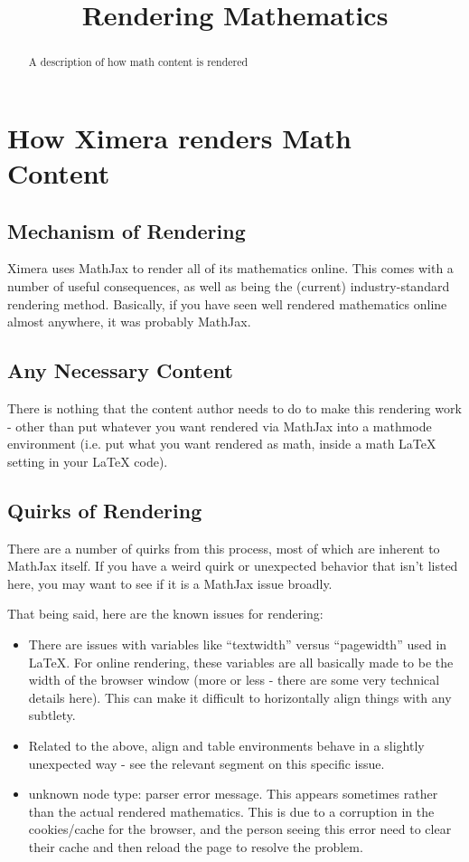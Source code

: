 \documentclass{ximera}
\title{Rendering Mathematics}
\begin{document}
\begin{abstract}
    A description of how math content is rendered
\end{abstract}
\maketitle
   
\section*{How Ximera renders Math Content}
    \subsection*{Mechanism of Rendering}
        Ximera uses MathJax to render all of its mathematics online. This comes with a number of useful consequences, as well as being the (current) industry-standard rendering method. Basically, if you have seen well rendered mathematics online almost anywhere, it was probably MathJax.
    
    
    \subsection*{Any Necessary Content}
        There is nothing that the content author needs to do to make this rendering work - other than put whatever you want rendered via MathJax into a mathmode environment (i.e. put what you want rendered as math, inside a math LaTeX setting in your LaTeX code).
    
    
    \subsection*{Quirks of Rendering}
        There are a number of quirks from this process, most of which are inherent to MathJax itself. If you have a weird quirk or unexpected behavior that isn't listed here, you may want to see if it is a MathJax issue broadly.
        
        That being said, here are the known issues for rendering:
        
        \begin{itemize}
            \item There are issues with variables like ``textwidth'' versus ``pagewidth'' used in LaTeX. For online rendering, these variables are all basically made to be the width of the browser window (more or less - there are some very technical details here). This can make it difficult to horizontally align things with any subtlety.
            \item Related to the above, align and table environments behave in a slightly unexpected way - see the relevant segment on this specific issue.
            \item unknown node type: parser error message. This appears sometimes rather than the actual rendered mathematics. This is due to a corruption in the cookies/cache for the browser, and the person seeing this error need to clear their cache and then reload the page to resolve the problem. 
        \end{itemize}
    
\end{document}
